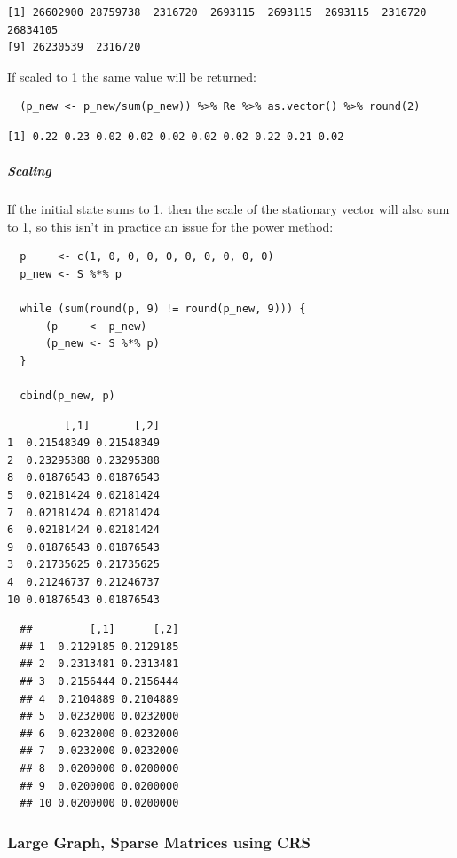 \documentclass[11pt]{article}
\begin{document}
\begin{verbatim}
[1] 26602900 28759738  2316720  2693115  2693115  2693115  2316720 26834105
[9] 26230539  2316720
\end{verbatim}


If scaled to 1 the
same value will be returned:

\lstset{language=r,label= ,caption= ,captionpos=b,numbers=none}
\begin{lstlisting}
  (p_new <- p_new/sum(p_new)) %>% Re %>% as.vector() %>% round(2)
\end{lstlisting}

\begin{verbatim}
[1] 0.22 0.23 0.02 0.02 0.02 0.02 0.02 0.22 0.21 0.02
\end{verbatim}

\subparagraph{Scaling}
\label{scaling}
If the initial state sums to 1, then the scale of the stationary
vector will also sum to 1, so this isn't in practice an issue for the power method:

\lstset{language=r,label= ,caption= ,captionpos=b,numbers=none}
\begin{lstlisting}
  p     <- c(1, 0, 0, 0, 0, 0, 0, 0, 0, 0)
  p_new <- S %*% p

  while (sum(round(p, 9) != round(p_new, 9))) {
      (p     <- p_new)
      (p_new <- S %*% p)
  }

  cbind(p_new, p)
\end{lstlisting}

\begin{verbatim}
         [,1]       [,2]
1  0.21548349 0.21548349
2  0.23295388 0.23295388
8  0.01876543 0.01876543
5  0.02181424 0.02181424
7  0.02181424 0.02181424
6  0.02181424 0.02181424
9  0.01876543 0.01876543
3  0.21735625 0.21735625
4  0.21246737 0.21246737
10 0.01876543 0.01876543
\end{verbatim}

\begin{verbatim}
  ##         [,1]      [,2]
  ## 1  0.2129185 0.2129185
  ## 2  0.2313481 0.2313481
  ## 3  0.2156444 0.2156444
  ## 4  0.2104889 0.2104889
  ## 5  0.0232000 0.0232000
  ## 6  0.0232000 0.0232000
  ## 7  0.0232000 0.0232000
  ## 8  0.0200000 0.0200000
  ## 9  0.0200000 0.0200000
  ## 10 0.0200000 0.0200000
\end{verbatim}
\subsubsection{Large Graph, Sparse Matrices using CRS}
\label{sec:org83a53c5}
\end{document}
